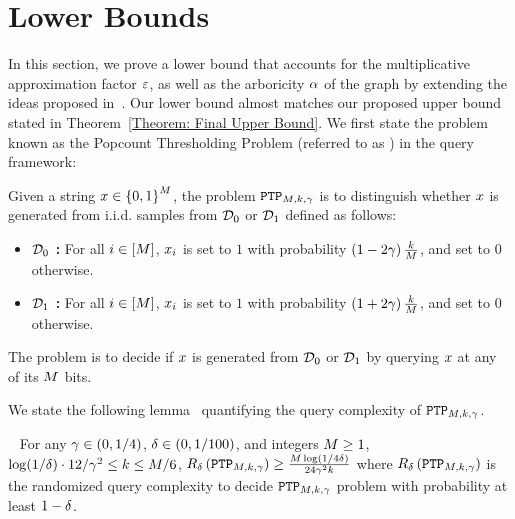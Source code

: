 \section{Lower Bounds}
\label{sec:lower-bound}
In this section, we prove a lower bound that accounts for the multiplicative approximation factor $\varepsilon$, as well as the arboricity $\alpha$ of the graph by extending the ideas proposed in~\citep{DBLP:conf/approx/AssadiN22}. Our lower bound 
almost matches our proposed upper bound stated in Theorem~\ref{Theorem: Final Upper Bound}. We first state the problem known as the {\sf Popcount Thresholding Problem} (referred to as \ptp{}) in the query framework:
\begin{definition}[$\defptp$]
    Given a string $x \in \left\{{0,1}\right\}^M$, the problem $\defptp$ is to  distinguish whether $x$ is  generated from i.i.d. samples from $\mathcal{D}_0$ or $\mathcal{D}_1$ defined as follows:
    \begin{itemize}
        \item \textbf{$\mathcal{D}_0$ :} For all $i \in \left[{M}\right]$, $x_i$ is set to $1$ with probability $\left({1-2\gamma}\right)\frac{k}{M}$, and set to $0$ otherwise.
        \item \textbf{$\mathcal{D}_1$ :} For all $i \in \left[{M}\right]$, $x_i$ is set to $1$ with probability $\left({1+2\gamma}\right)\frac{k}{M}$, and set to $0$ otherwise.
    \end{itemize}
    The problem is to decide if $x$ is generated from $\mathcal{D}_0$ or $\mathcal{D}_1$ by querying $x$ at any of its $M$ bits.
\end{definition}
We state the following lemma~\citep{DBLP:conf/approx/AssadiN22} quantifying the query complexity of $\defptp$. 
\begin{lemma}~\cite{DBLP:conf/approx/AssadiN22}\label{Lemma: PTP Query Lower Bound}
    For any $\gamma \in (0,1/4)$, $\delta \in (0,1/100)$, and integers $M \geq 1$, $\log(1/\delta)\cdot12/\gamma^2\leq k \leq M/6$, $R_{\delta}\left({\texttt{PTP}_{M,k,\gamma}}\right) \geq \frac{M\log\left({1/4\delta}\right)}{24\gamma^2k}$
    where $R_{\delta}\left({\texttt{PTP}_{M,k,\gamma}}\right)$ is the randomized query complexity to decide $\texttt{PTP}_{M,k,\gamma}{}$ problem with probability at least $1 - \delta$.
\end{lemma}

